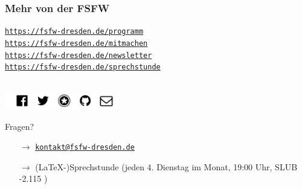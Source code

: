\documentclass{beamer}
\begin{document}
\begin{frame}
  \frametitle{Mehr von der FSFW}
  \onslide<+->



  \begin{center}
  \parbox{7.3cm}{
    \href{https://fsfw-dresden.de/programm}{\texttt{{\color{gray!20}https://fsfw-dresden.de/}programm}}\\[1mm]
    \href{https://fsfw-dresden.de/mitmachen}{\texttt{{\color{gray!40}https://fsfw-dresden.de/}mitmachen}}\\[1mm]
    \href{https://fsfw-dresden.de/newsletter}{\texttt{{\color{gray!60}https://fsfw-dresden.de/}newsletter}}\\[1mm]
    \href{https://fsfw-dresden.de/sprechstunde}{\texttt{{\color{gray!60}https://fsfw-dresden.de/}sprechstunde}}\\[3mm]
  }\\[3mm]

    \includegraphics[width=50mm]{fsfw-netzwerke}\\[3mm]

    \parbox{7.8cm}{
    Fragen?
    \begin{itemize}
     \item[$\rightarrow$]\href{mailto:kontakt@fsfw-dresden.de}{\texttt{kontakt@fsfw-dresden.de}}
     \item[$\rightarrow$] (\LaTeX-)Sprechstunde (jeden 4. Dienstag im Monat, 19:00 Uhr, SLUB -2.115 )
    \end{itemize}

  }
  \end{center}

\end{frame}
\end{document}
